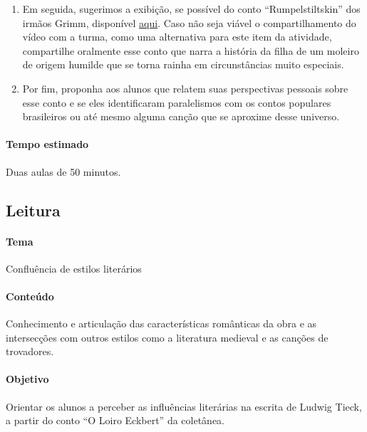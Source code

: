 \documentclass[12pt]{extarticle}
\begin{document}
\begin{enumerate}


\item 
Em seguida, sugerimos a exibição, se possível do conto ``Rumpelstiltskin'' dos irmãos Grimm, 
disponível \href{https://www.youtube.com/watch?v=ZevUDlfqyo4&ab_channel=teatrodecontosdefada}{aqui}.
Caso não seja viável o compartilhamento do vídeo com a turma, como uma alternativa para este item 
da atividade, compartilhe oralmente esse conto que narra a história da filha de um moleiro de origem 
humilde que se torna rainha em circunstâncias muito especiais.

\item 
Por fim, proponha aos alunos que relatem suas perspectivas pessoais sobre esse conto e se eles identificaram 
paralelismos com os contos populares brasileiros ou até mesmo alguma canção que se aproxime desse universo.

\end{enumerate}

\paragraph{Tempo estimado} Duas aulas de 50 minutos. 

\subsection{Leitura}


\paragraph{Tema} Confluência de estilos literários

\paragraph{Conteúdo} Conhecimento e articulação das características românticas da 
obra e as intersecções com outros estilos como a literatura medieval e as canções 
de trovadores.

\paragraph{Objetivo} Orientar os alunos a perceber as influências literárias na escrita 
de Ludwig Tieck, a partir do conto ``O Loiro Eckbert'' da coletânea.
\end{document}
